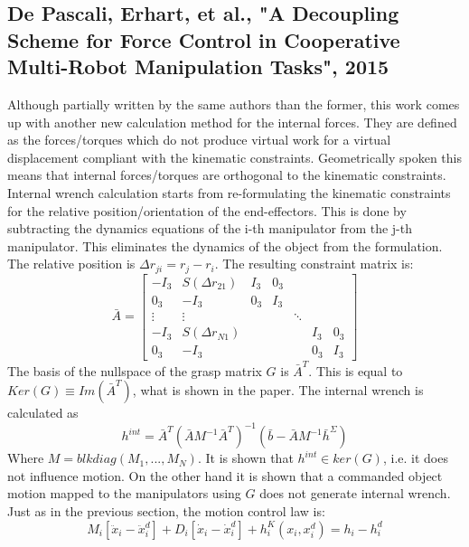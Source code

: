 \documentclass[conference]{IEEEtran}
\begin{document}

\subsection{De Pascali, Erhart, et al., "A Decoupling Scheme for Force Control in Cooperative Multi-Robot Manipulation Tasks", 2015}

Although partially written by the same authors than the former, this work comes up with another new calculation method for the internal forces. They are defined as the forces/torques which do not produce virtual work for a virtual displacement compliant with the kinematic constraints. Geometrically spoken this means that internal forces/torques are orthogonal to the kinematic constraints. Internal wrench calculation starts from re-formulating the kinematic constraints for the relative position/orientation of the end-effectors. This is done by subtracting the dynamics equations of the i-th manipulator from the j-th manipulator. This eliminates the dynamics of the object from the formulation. The relative position is $ \Delta r_{ji} = r_j-r_i $. The resulting constraint matrix is: 
\begin{equation}
\bar{A} =
\begin{bmatrix}
-I_3 & S(\Delta r_{21}) & I_3 & 0_3 & & &\\
0_3 & -I_3 & 0_3 & I_3 & & &\\
\vdots & \vdots & & & \ddots & & \\
-I_3 & S(\Delta r_{N1}) & & & & I_3 & 0_3\\
0_3 & -I_3 & & & & 0_3 & I_3
\end{bmatrix}
\end{equation}
The basis of the nullspace of the grasp matrix $ G $ is $ \bar{A}^T $. This is equal to $ Ker(G)\equiv Im(\bar{A}^T) $, what is shown in the paper. The internal wrench is calculated as
\begin{equation}
h^{int} = \bar{A}^T(\bar{A}M^{-1}\bar{A}^T)^{-1}(\bar{b}-\bar{A}M^{-1}\bar{h}^{\Sigma})
\end{equation}
Where $ M = blkdiag(M_1,...,M_N) $.
It is shown that $ h^{int} \in ker(G) $, i.e. it does not influence motion. On the other hand it is shown that a commanded object motion mapped to the manipulators using $ G $ does not generate internal wrench. Just as in the previous section, the motion control law is: 
\begin{equation}
M_i[\ddot{x}_i - \ddot{x}_i^d] + D_i[\dot{x}_i - \dot{x}_i^d] + h_i^K(x_i,x_i^d) = h_i - h_i^d
\end{equation}
\end{document}
